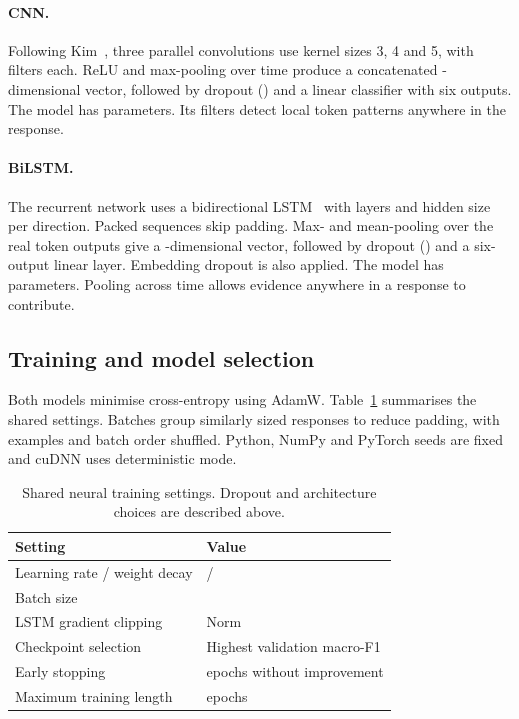 \documentclass[11pt]{article}
\begin{document}
\paragraph{CNN.} Following Kim~\cite{kim2014}, three parallel convolutions use kernel sizes 3, 4 and 5,
with \CnnFilters{} filters each. ReLU and max-pooling over time produce a concatenated
\CnnFeatureDim-dimensional vector, followed by dropout (\CnnDropout{}) and a linear classifier with six
outputs. The model has \CnnParams{} parameters. Its filters detect local token patterns anywhere in the response.

\paragraph{BiLSTM.} The recurrent network uses a bidirectional LSTM~\cite{hochreiter1997} with
\LstmLayers{} layers and hidden size \LstmHidden{} per direction. Packed sequences skip padding. Max- and
mean-pooling over the real token outputs give a \LstmFeatureDim-dimensional vector, followed by dropout
(\LstmDropout{}) and a six-output linear layer. Embedding dropout is also applied. The model has
\LstmParams{} parameters. Pooling across time allows evidence anywhere in a response to contribute.

\subsection{Training and model selection}
Both models minimise cross-entropy using AdamW. Table~\ref{tab:training} summarises the shared settings.
Batches group similarly sized responses to reduce padding, with examples and batch order shuffled.
Python, NumPy and PyTorch seeds are fixed and cuDNN uses deterministic mode.

\begin{table}[!htb]
\centering\small
\caption{Shared neural training settings. Dropout and architecture choices are described above.}
\label{tab:training}
\begin{tabular}{ll}
\toprule
Setting & Value \\
\midrule
Learning rate / weight decay & \LearningRate{} / \WeightDecay{} \\
Batch size & \BatchSize{} \\
LSTM gradient clipping & Norm \GradClip{} \\
Checkpoint selection & Highest validation macro-F1 \\
Early stopping & \Patience{} epochs without improvement \\
Maximum training length & \MaxEpochs{} epochs \\
\bottomrule
\end{tabular}
\end{table}
\end{document}
